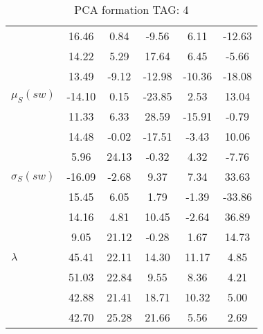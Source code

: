 \begin{table}[h!]
\begin{center}
\begin{tabular}{| l || c | c | c | c | c |}
 & 16.46  & 0.84  & -9.56  & 6.11  & -12.63 \\
 & 14.22  & 5.29  & 17.64  & 6.45  & -5.66 \\
 & 13.49  & -9.12  & -12.98  & -10.36  & -18.08 \\\hline
$\mu_S(sw)$ & -14.10  & 0.15  & -23.85  & 2.53  & 13.04 \\
 & 11.33  & 6.33  & 28.59  & -15.91  & -0.79 \\
 & 14.48  & -0.02  & -17.51  & -3.43  & 10.06 \\
 & 5.96  & 24.13  & -0.32  & 4.32  & -7.76 \\\hline
$\sigma_S(sw)$ & -16.09  & -2.68  & 9.37  & 7.34  & 33.63 \\
 & 15.45  & 6.05  & 1.79  & -1.39  & -33.86 \\
 & 14.16  & 4.81  & 10.45  & -2.64  & 36.89 \\
 & 9.05  & 21.12  & -0.28  & 1.67  & 14.73 \\\hline\hline
$\lambda$ & 45.41  & 22.11  & 14.30  & 11.17  & 4.85 \\
 & 51.03  & 22.84  & 9.55  & 8.36  & 4.21 \\
 & 42.88  & 21.41  & 18.71  & 10.32  & 5.00 \\
 & 42.70  & 25.28  & 21.66  & 5.56  & 2.69 \\\hline
\end{tabular}
\caption{PCA formation TAG: 4}
\end{center}
\end{table}